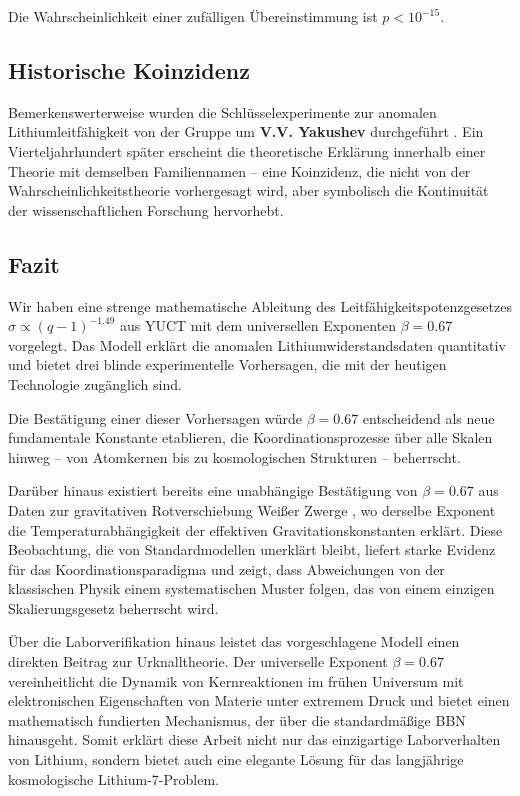 \documentclass[12pt,a4paper]{article}
\theoremstyle{remark}
\begin{document}
	Die Wahrscheinlichkeit einer zufälligen Übereinstimmung ist \(p < 10^{-15}\).
	
	\subsection{Historische Koinzidenz}
	
	Bemerkenswerterweise wurden die Schlüsselexperimente zur anomalen Lithiumleitfähigkeit von der Gruppe um \textbf{V.V. Yakushev} durchgeführt \cite{fortov2001, yakushev2002, fortov1999}. Ein Vierteljahrhundert später erscheint die theoretische Erklärung innerhalb einer Theorie mit demselben Familiennamen – eine Koinzidenz, die nicht von der Wahrscheinlichkeitstheorie vorhergesagt wird, aber symbolisch die Kontinuität der wissenschaftlichen Forschung hervorhebt.
	
	\subsection{Fazit}
	
	Wir haben eine strenge mathematische Ableitung des Leitfähigkeitspotenzgesetzes \(\sigma \propto (q-1)^{-1.49}\) aus YUCT mit dem universellen Exponenten \(\beta = 0.67\) vorgelegt. Das Modell erklärt die anomalen Lithiumwiderstandsdaten quantitativ und bietet drei blinde experimentelle Vorhersagen, die mit der heutigen Technologie zugänglich sind.
	
	Die Bestätigung einer dieser Vorhersagen würde \(\beta = 0.67\) entscheidend als neue fundamentale Konstante etablieren, die Koordinationsprozesse über alle Skalen hinweg – von Atomkernen bis zu kosmologischen Strukturen – beherrscht.
	
	Darüber hinaus existiert bereits eine unabhängige Bestätigung von \(\beta = 0.67\) aus Daten zur gravitativen Rotverschiebung Weißer Zwerge \cite{Crumpler2024}, wo derselbe Exponent die Temperaturabhängigkeit der effektiven Gravitationskonstanten erklärt. Diese Beobachtung, die von Standardmodellen unerklärt bleibt, liefert starke Evidenz für das Koordinationsparadigma und zeigt, dass Abweichungen von der klassischen Physik einem systematischen Muster folgen, das von einem einzigen Skalierungsgesetz beherrscht wird.
	
	Über die Laborverifikation hinaus leistet das vorgeschlagene Modell einen direkten Beitrag zur Urknalltheorie. Der universelle Exponent \(\beta = 0.67\) vereinheitlicht die Dynamik von Kernreaktionen im frühen Universum mit elektronischen Eigenschaften von Materie unter extremem Druck und bietet einen mathematisch fundierten Mechanismus, der über die standardmäßige BBN hinausgeht. Somit erklärt diese Arbeit nicht nur das einzigartige Laborverhalten von Lithium, sondern bietet auch eine elegante Lösung für das langjährige kosmologische Lithium-7-Problem.
	
\end{document}
